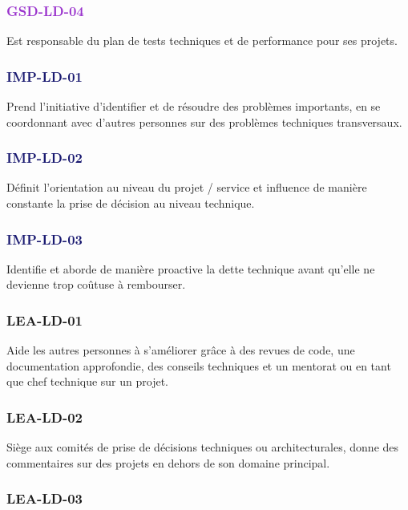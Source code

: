 \documentclass[a4paper, french, openany, 12pt]{book}
\newcommand\str[1]{\textcolor{DarkOrchid}{\textbf{\uppercase{gsd-{#1}}}}}
\newcommand\wis[1]{\textcolor{MidnightBlue}{\textbf{\uppercase{imp-{#1}}}}}
\newcommand\cha[1]{\textcolor{OliveGreen}{\textbf{\uppercase{lea-{#1}}}}}
\begin{document}
\begin{multicols}{2}
  \subsubsection*{\str{ld-04}}

  Est responsable du plan de tests techniques et de performance pour ses projets.

  \subsubsection*{\wis{ld-01}}

  Prend l'initiative d'identifier et de résoudre des problèmes importants, en se coordonnant avec d'autres personnes sur
  des problèmes techniques transversaux.

  \subsubsection*{\wis{ld-02}}

  Définit l'orientation au niveau du projet / service et influence de manière constante la prise de décision au niveau
  technique.
  \subsubsection*{\wis{ld-03}}

  Identifie et aborde de manière proactive la dette technique avant qu'elle ne devienne trop coûtuse à rembourser.

  \subsubsection*{\cha{ld-01}}

  Aide les autres personnes à s'améliorer grâce à des revues de code, une documentation approfondie, des conseils 
  techniques et un mentorat ou en tant que chef technique sur un projet.

  \subsubsection*{\cha{ld-02}}

  Siège aux comités de prise de décisions techniques ou architecturales, donne des commentaires sur des projets en dehors 
  de son domaine principal.
  
  \subsubsection*{\cha{ld-03}}


\end{multicols}
\end{document}
